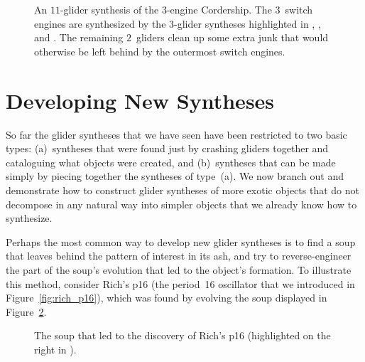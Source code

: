 \begin{figure}[!htb]
	\centering
	 \\[1em]
	
	 \\[1em]
	\caption{An $11$-glider synthesis of the $3$-engine Cordership. The $3$~switch engines are synthesized by the $3$-glider syntheses highlighted in , , and . The remaining $2$~gliders clean up some extra junk that would otherwise be left behind by the outermost switch engines.}\label{fig:3_engine_cordership_synthesis}
\end{figure}



\section{Developing New Syntheses}\label{sec:new_syntheses}

So far the glider syntheses that we have seen have been restricted to two basic types: (a)~syntheses that were found just by crashing gliders together and cataloguing what objects were created, and (b)~syntheses that can be made simply by piecing together the syntheses of type~(a). We now branch out and demonstrate how to construct glider syntheses of more exotic objects that do not decompose in any natural way into simpler objects that we already know how to synthesize.

Perhaps the most common way to develop new glider syntheses is to find a soup that leaves behind the pattern of interest in its ash, and try to reverse-engineer the part of the soup's evolution that led to the object's formation. To illustrate this method, consider Rich's p16 (the period~16 oscillator that we introduced in Figure~\ref{fig:rich_p16}), which was found by evolving the soup displayed in Figure~\ref{fig:richs_p16_soup}.

\begin{figure}[!ht]
	\centering{}
	\caption{The soup that led to the discovery of Rich's p16 (highlighted on the right in ).}\label{fig:richs_p16_soup}
\end{figure}

